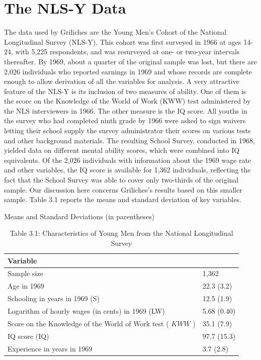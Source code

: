 \documentclass[10pt]{article}
\begin{document}
\section*{The NLS-Y Data}
The data used by Griliches are the Young Men's Cohort of the National Longitudinal Survey (NLS-Y). This cohort was first surveyed in 1966 at ages 14-24, with 5,225 respondents, and was resurveyed at one- or two-year intervals thereafter. By 1969, about a quarter of the original sample was lost, but there are 2,026 individuals who reported earnings in 1969 and whose records are complete enough to allow derivation of all the variables for analysis. A very attractive feature of the NLS-Y is its inclusion of two measures of ability. One of them is the score on the Knowledge of the World of Work (KWW) test administered by the NLS interviewers in 1966. The other measure is the IQ score. All youths in the survey who had completed ninth grade by 1966 were asked to sign waivers letting their school supply the survey administrator their scores on various tests and other background materials. The resulting School Survey, conducted in 1968, yielded data on different mental ability scores, which were combined into IQ equivalents. Of the 2,026 individuals with information about the 1969 wage rate and other variables, the IQ score is available for 1,362 individuals, reflecting the fact that the School Survey was able to cover only two-thirds of the original sample. Our discussion here concerns Griliches's results based on this smaller sample. Table 3.1 reports the means and standard deviation of key variables.

Means and Standard Deviations (in parentheses)

\begin{table}[h]
\begin{center}
\captionsetup{labelformat=empty}
\caption{Table 3.1: Characteristics of Young Men from the National Longitudinal Survey}
\begin{tabular}{|l|l|}
\hline
\multicolumn{2}{|l|}{Variable} \\
\hline
Sample size & 1,362 \\
\hline
Age in 1969 & 22.3 (3.2) \\
\hline
Schooling in years in 1969 (S) & 12.5 (1.9) \\
\hline
Logarithm of hourly wages (in cents) in 1969 (LW) & 5.68 (0.40) \\
\hline
Score on the Knowledge of the World of Work test ( $K W W$ ) & 35.1 (7.9) \\
\hline
IQ score (IQ) & 97.7 (15.3) \\
\hline
Experience in years in 1969 & 3.7 (2.8) \\
\hline
\end{tabular}
\end{center}
\end{table}
\end{document}
